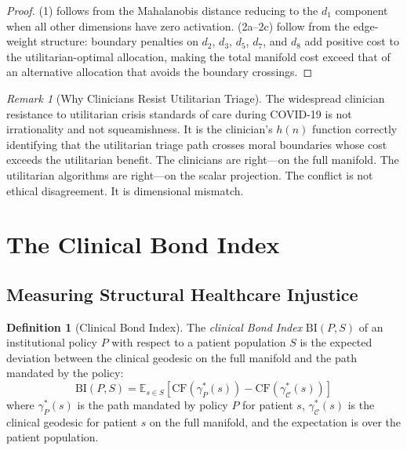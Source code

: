 \documentclass[12pt]{article}
\theoremstyle{definition}
\newtheorem{definition}[theorem]{Definition}
\theoremstyle{remark}
\newtheorem{remark}[theorem]{Remark}
\newcommand{\C}{\mathcal{C}}               %
\newcommand{\CF}{\mathrm{CF}}              %
\newcommand{\BI}{\mathrm{BI}}              %
\begin{document}
\begin{proof}
(1) follows from the Mahalanobis distance reducing to the $d_1$ component when all other dimensions have zero activation.  (2a--2c) follow from the edge-weight structure: boundary penalties on $d_2$, $d_3$, $d_5$, $d_7$, and $d_8$ add positive cost to the utilitarian-optimal allocation, making the total manifold cost exceed that of an alternative allocation that avoids the boundary crossings.
\end{proof}

\begin{remark}[Why Clinicians Resist Utilitarian Triage]
The widespread clinician resistance to utilitarian crisis standards of care during COVID-19 \cite{greenberg2020,emanuel2020} is not irrationality and not squeamishness.  It is the clinician's $h(n)$ function correctly identifying that the utilitarian triage path crosses moral boundaries whose cost exceeds the utilitarian benefit.  The clinicians are right---on the full manifold.  The utilitarian algorithms are right---on the scalar projection.  The conflict is not ethical disagreement.  It is dimensional mismatch.
\end{remark}


\section{The Clinical Bond Index}
\label{sec:bond_index}

\subsection{Measuring Structural Healthcare Injustice}

\begin{definition}[Clinical Bond Index]
\label{def:clinical_bi}
The \emph{clinical Bond Index} $\BI(P, S)$ of an institutional policy $P$ with respect to a patient population $S$ is the expected deviation between the clinical geodesic on the full manifold and the path mandated by the policy:
\begin{equation}
\BI(P, S) = \mathbb{E}_{s \in S}\left[\CF(\gamma_P^*(s)) - \CF(\gamma_\C^*(s))\right]
\label{eq:clinical_bi}
\end{equation}
where $\gamma_P^*(s)$ is the path mandated by policy $P$ for patient $s$, $\gamma_\C^*(s)$ is the clinical geodesic for patient $s$ on the full manifold, and the expectation is over the patient population.
\end{definition}
\end{document}
